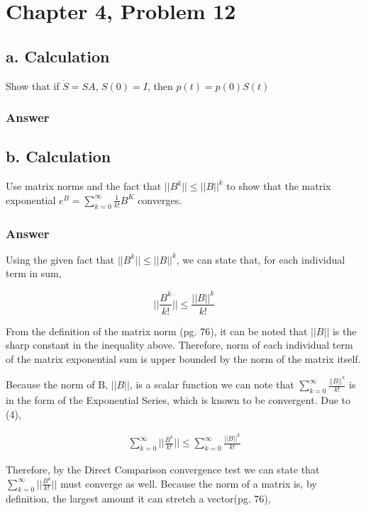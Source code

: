 \documentclass{article}
\newcommand{\n}{\newline}
\begin{document}
	\section{Chapter 4, Problem 12}
		\subsection{a. Calculation}
		Show that if $\dot{S}=SA$, $S(0)=I$, then $p(t)=p(0)S(t)$
		\subsubsection{Answer}
		
		\subsection{b. Calculation}
		Use matrix norms and the fact that $||B^{k}||\leq||B||^{k}$ to show that the matrix exponential $e^{B}=\sum_{k=0}^{\infty}\frac{1}{k!}B^{K}$ converges.
		\subsubsection{Answer}
		
		Using the given fact that $||B^{k}||\leq||B||^{k}$, we can state that, for each individual term in sum, 
		
		\begin{equation}
			||\frac{B^{k}}{k!}||\leq\frac{||B||^{k}}{k!}
		\end{equation}
		
		From the definition of the matrix norm \cite{BG}(pg. 76), it can be noted that $||B||$ is the sharp constant in the inequality above.  Therefore, norm of each individual term of the matrix exponential sum is upper bounded by the norm of the matrix itself. \n
		
		Because the norm of B, $||B||$, is a scalar function we can note that $\sum_{k=0}^{\infty}\frac{||B||^k}{k!}$ is in the form of the Exponential Series, which is known to be convergent.  Due to (4),
		
		\begin{align*}
			\sum_{k=0}^{\infty}||\frac{B^k}{k!}||\leq\sum_{k=0}^{\infty}\frac{||B||^k}{k!}
		\end{align*} 
		
		Therefore, by the Direct Comparison convergence test\cite{ComTest} we can state that $\sum_{k=0}^{\infty}||\frac{B^k}{k!}||$ must converge as well.  Because the norm of a matrix is, by definition, the largest amount it can stretch a vector\cite{BG}(pg. 76), 
		
\end{document}
